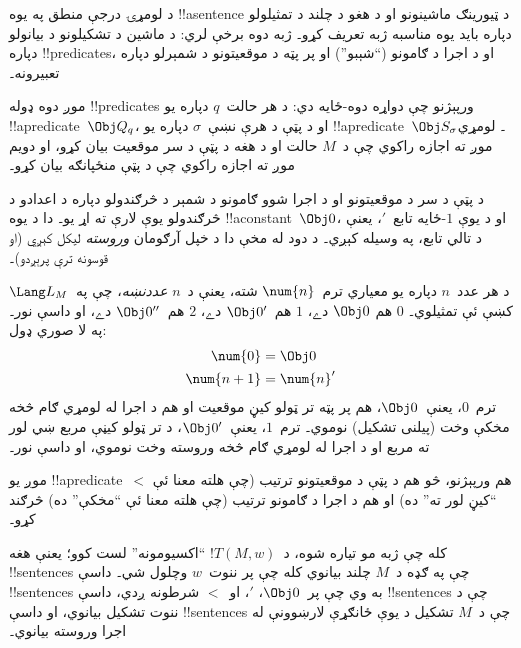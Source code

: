 \documentclass[../../../include/open-logic-section]{subfiles}
\begin{document}

\begin{explain}
د لومړۍ درجې منطق په يوه !!a{sentence} د ټيورينګ ماشينونو او د هغو
د چلند د تمثيلولو دپاره بايد يوه مناسبه ژبه تعريف کړو۔ ژبه دوه برخې
لري: د ماشين د تشکيلونو د بيانولو دپاره !!{predicate}s، او د اجرا د
ګامونو (``شېبو'') او پر پټه د موقعيتونو د شمېرلو دپاره تعبيرونه۔

موږ دوه ډوله !!{predicate}s ورپېژنو چې دواړه دوه-ځايه دي: د هر
حالت~$q$ دپاره يو !!a{predicate}~$\Obj Q_q$، او د پټې د هرې
نښې~$\sigma$ دپاره يو !!a{predicate}~$\Obj S_\sigma$۔ لومړي موږ ته
اجازه راکوي چې د~$M$ حالت او د هغه د پټې د سر موقعيت بيان کړو، او
دويم موږ ته اجازه راکوي چې د پټې منځپانګه بيان کړو۔

د پټې د سر د موقعيتونو او د اجرا شوو ګامونو د شمېر د څرګندولو دپاره
د اعدادو د څرګندولو يوې لارې ته اړ يو۔ دا د يوه !!a{constant}~$\Obj
0$، او د يوې $1$-ځايه تابع~$\prime$، يعنې د تالي تابع، په وسيله کېږي۔
د دود له مخې دا د خپل آرګومان \emph{وروسته} ليکل کېږي (او قوسونه
ترې پرېږدو)۔

د هر عدد~$n$ دپاره يو معياري ترم~$\num{n}$ شته، يعنې د~$n$
\emph{عددنښه}، چې په~$\Lang L_M$ کښې ئې تمثيلوي۔ $\num{0}$ هم
$\Obj 0$ دے، $\num{1}$ هم~$\Obj 0'$ دے، $\num{2}$ هم~$\Obj 0''$
دے، او داسې نور۔ په لا صوري ډول:
\begin{align*}
\num{0} & = \Obj 0 \\
\num{n+1} &= \num{n}'
\end{align*}
ترم~$\num{0}$، يعنې~$\Obj 0$، هم پر پټه تر ټولو کيڼ موقعيت او هم د
اجرا له لومړي ګام څخه مخکې وخت (پيلنی تشکيل) نوموي۔ ترم~$\num{1}$،
يعنې~$\Obj 0'$، د تر ټولو کيڼې مربع ښي لور ته مربع او د اجرا له لومړي
ګام څخه وروسته وخت نوموي، او داسې نور۔

موږ يو !!a{predicate}~$<$ هم ورپېژنو، څو هم د پټې د موقعيتونو ترتيب
(چې هلته معنا ئې ``کيڼ لور ته'' ده) او هم د اجرا د ګامونو ترتيب
(چې هلته معنا ئې ``مخکې'' ده) څرګند کړو۔

کله چې ژبه مو تياره شوه، د~$!T(M, w)$ ``اکسيومونه'' لست کوو؛ يعنې
هغه !!{sentence}s چې په ګډه د~$M$ چلند بيانوي کله چې پر ننوت~$w$
وچلول شي۔ داسې !!{sentence}s به وي چې پر~$\Obj 0$، $\prime$، او~$<$
شرطونه ږدي، داسې !!{sentence}s چې د ننوت تشکيل بيانوي، او داسې
!!{sentence}s چې د~$M$ تشکيل د يوې ځانګړې لارښوونې له اجرا وروسته
بيانوي۔
\end{explain}
\end{document}
